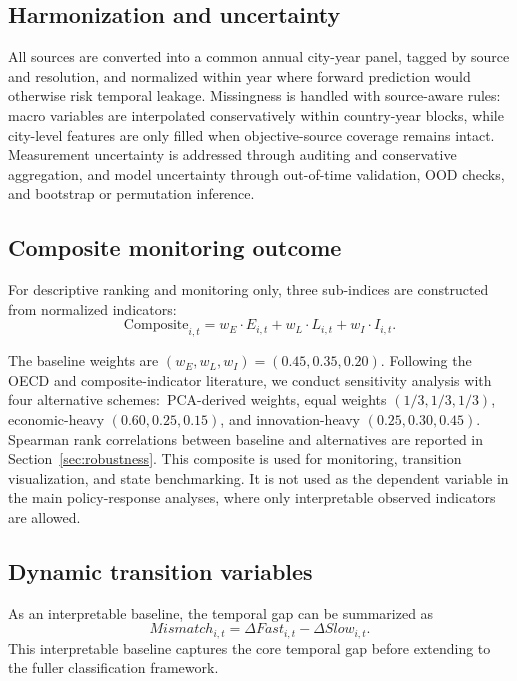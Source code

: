\documentclass[oneside,pdflatex,sn-nature]{sn-jnl}
\newcommand{\Composite}{\text{Composite}}
\begin{document}
\subsection{Harmonization and uncertainty}
All sources are converted into a common annual city-year panel, tagged by source and resolution, and normalized within year where forward prediction would otherwise risk temporal leakage. Missingness is handled with source-aware rules: macro variables are interpolated conservatively within country-year blocks, while city-level features are only filled when objective-source coverage remains intact. Measurement uncertainty is addressed through auditing and conservative aggregation, and model uncertainty through out-of-time validation, OOD checks, and bootstrap or permutation inference.

\subsection{Composite monitoring outcome}
For descriptive ranking and monitoring only, three sub-indices are constructed from normalized indicators:
\begin{equation}
  \Composite_{i,t} = w_E \cdot E_{i,t} + w_L \cdot L_{i,t} + w_I \cdot I_{i,t}.
\end{equation}

The baseline weights are $(w_E, w_L, w_I) = (0.45, 0.35, 0.20)$. Following the OECD and composite-indicator literature,\cite{oecd2008handbook,nardo2005tools,greco2019composite} we conduct sensitivity analysis with four alternative schemes:\ PCA-derived weights, equal weights $(1/3, 1/3, 1/3)$, economic-heavy $(0.60, 0.25, 0.15)$, and innovation-heavy $(0.25, 0.30, 0.45)$. Spearman rank correlations between baseline and alternatives are reported in Section~\ref{sec:robustness}. This composite is used for monitoring, transition visualization, and state benchmarking. It is not used as the dependent variable in the main policy-response analyses, where only interpretable observed indicators are allowed.

\subsection{Dynamic transition variables}
As an interpretable baseline, the temporal gap can be summarized as
\begin{equation}
Mismatch_{i,t} = \Delta Fast_{i,t} - \Delta Slow_{i,t}.
\end{equation}
This interpretable baseline captures the core temporal gap before extending to the fuller classification framework.
\end{document}
